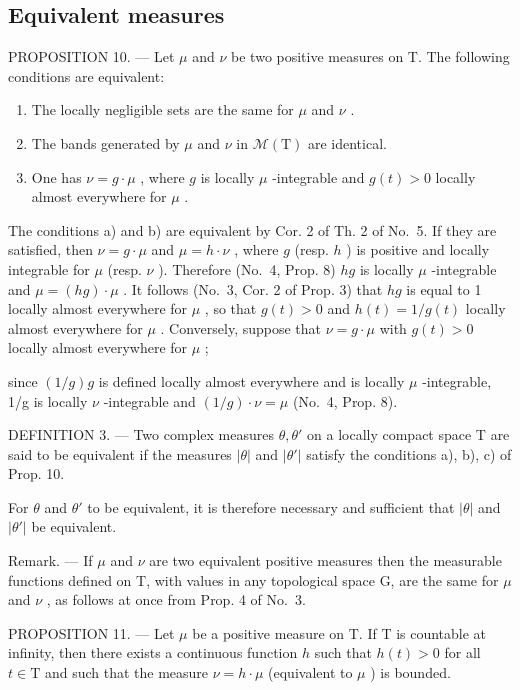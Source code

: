 \subsection{Equivalent measures}

PROPOSITION 10. --- Let \(\mu\) and \(\nu\) be two positive measures on T. The following conditions are equivalent:

\begin{enumerate}
\def\labelenumi{\alph{enumi})}
\item
  The locally negligible sets are the same for \(\mu\) and \(\nu\) .
\item
  The bands generated by \(\mu\) and \(\nu\) in \(\mathcal{M}(\mathrm{T})\) are identical.
\item
  One has \(\nu = g \cdot \mu\) , where \(g\) is locally \(\mu\) -integrable and \(g(t) > 0\) locally almost everywhere for \(\mu\) .
\end{enumerate}

The conditions a) and b) are equivalent by Cor. 2 of Th. 2 of No.~5. If they are satisfied, then \(\nu = g \cdot \mu\) and \(\mu = h \cdot \nu\) , where \(g\) (resp. \(h\) ) is positive and locally integrable for \(\mu\) (resp. \(\nu\) ). Therefore (No.~4, Prop. 8) \(hg\) is locally \(\mu\) -integrable and \(\mu = (hg) \cdot \mu\) . It follows (No.~3, Cor. 2 of Prop. 3) that \(hg\) is equal to 1 locally almost everywhere for \(\mu\) , so that \(g(t) > 0\) and \(h(t) = 1/g(t)\) locally almost everywhere for \(\mu\) . Conversely, suppose that \(\nu = g \cdot \mu\) with \(g(t) > 0\) locally almost everywhere for \(\mu\) ;

since \((1/g)g\) is defined locally almost everywhere and is locally \(\mu\) -integrable, 1/g is locally \(\nu\) -integrable and \((1/g)\cdot\nu=\mu\) (No.~4, Prop. 8).

DEFINITION 3. --- Two complex measures \(\theta, \theta'\) on a locally compact space T are said to be equivalent if the measures \(|\theta|\) and \(|\theta'|\) satisfy the conditions a), b), c) of Prop. 10.

For \(\theta\) and \(\theta'\) to be equivalent, it is therefore necessary and sufficient that \(|\theta|\) and \(|\theta'|\) be equivalent.

Remark. --- If \(\mu\) and \(\nu\) are two equivalent positive measures then the measurable functions defined on T, with values in any topological space G, are the same for \(\mu\) and \(\nu\) , as follows at once from Prop. 4 of No.~3.

PROPOSITION 11. --- Let \(\mu\) be a positive measure on T. If T is countable at infinity, then there exists a continuous function \(h\) such that \(h(t) > 0\) for all \(t \in \mathrm{T}\) and such that the measure \(\nu = h \cdot \mu\) (equivalent to \(\mu\) ) is bounded.

